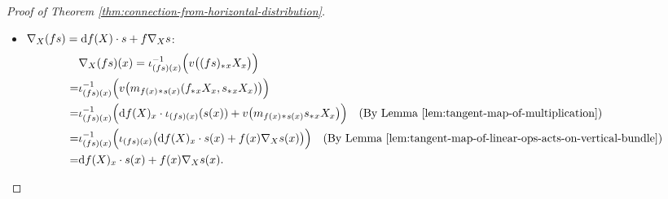 \begin{proof}[Proof of Theorem \ref{thm:connection-from-horizontal-distribution}]
\begin{itemize}
        For $\mathbb{R}$-linearity, 
        \begin{align*}
            &\nabla_X (\lambda s)(x) = \iota_{(\lambda s)(x)}^{-1}\Big(v\big((\lambda s)_*{}_x(X_x)\big)\Big) \\
            =& \iota_{(\lambda s)(x)}^{-1}\Big(v\big(m_{\lambda}{}_*{}_{s(x)}s_*{}_x(X_x)\big)\Big) \\
            =& \iota_{(\lambda s)(x)}^{-1}\Big(m_{\lambda}{}_*{}_{s(x)}v\big(s_*{}_x(X_x)\big)\Big) 
            \quad\text{(By Lemma \ref{lem:H-compatible-with-linear-str})}\\
            =& \iota_{(\lambda s)(x)}^{-1}\Big(\iota_{(\lambda s)(x)}(\lambda \nabla_X s(x))\Big) 
            \quad\text{(By Lemma \ref{lem:tangent-map-of-linear-ops-acts-on-vertical-bundle})}\\
            =& \lambda \nabla_X s(x),
        \end{align*}
        For additivity,
        \begin{align*}
            &\nabla_X (s_1 + s_2)(x) = \iota_{(s_1 + s_2)(x)}^{-1}\Big(v\big((s_1 + s_2)_*{}_x X_x\big)\Big) \\
            =& \iota_{(s_1 + s_2)(x)}^{-1}\Big(v\big(a_*{}_{(s_1(x),s_2(x))}(s_{1*}{}_x X_x, s_{2*}{}_x X_x)\big)\Big) \\
            =& \iota_{(s_1 + s_2)(x)}^{-1}\Big(a_*{}_{(s_1(x),s_2(x))}\big(v(s_{1*}{}_x X_x), v(s_{2*}{}_x X_x)\big)\Big) 
            \quad\text{(By Lemma \ref{lem:H-compatible-with-linear-str})}\\
            =& \iota_{(s_1 + s_2)(x)}^{-1}\Big(\iota_{(s_1 + s_2)(x)}(\nabla_X s_1(x) + \nabla_X s_2(x))\Big) 
            \quad\text{(By Lemma \ref{lem:tangent-map-of-linear-ops-acts-on-vertical-bundle})}\\
            =& \nabla_X s_1(x) + \nabla_X s_2(x).
        \end{align*}
        \item $\nabla_X (fs) = {\rm d} f(X)\cdot s + f\nabla_X s$:
        \begin{align*}
            &\nabla_X (fs)(x) = \iota_{(fs)(x)}^{-1}\Big(v\big((fs)_*{}_x X_x\big)\Big) \\
            =& \iota_{(fs)(x)}^{-1}\Big(v\big(m_{f(x)}{}_*{}_{s(x)}(f_*{}_x X_x, s_*{}_x X_x)\big)\Big) \\ 
            =& \iota_{(fs)(x)}^{-1}\Big({\rm d} f(X)_x\cdot \iota_{(fs)(x)}(s(x)) + v\big(m_{f(x)}{}_*{}_{s(x)}s_*{}_x X_x\big)\Big) 
            \quad\text{(By Lemma \ref{lem:tangent-map-of-multiplication})}\\
            =& \iota_{(fs)(x)}^{-1}\Big(\iota_{(fs)(x)}\big({\rm d} f(X)_x\cdot s(x) + f(x)\nabla_X s(x)\big)\Big) 
            \quad\text{(By Lemma \ref{lem:tangent-map-of-linear-ops-acts-on-vertical-bundle})}\\
            =& {\rm d} f(X)_x\cdot s(x) + f(x)\nabla_X s(x). \qedhere
        \end{align*}
    \end{itemize}
\end{proof}
